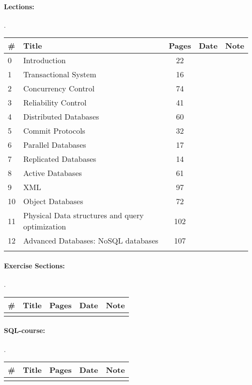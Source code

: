 \documentclass[a4paper,12pt]{article} %
\begin{document}
\paragraph{Lections:}.\\
\begin{tabularx}{\textwidth}{|l|X|c|l|c|}
	\hline
	\# & Title & Pages & Date & Note \\
	\hline
	0 & Introduction & 22 &  &  \\
	\hline
	1 & Transactional System & 16 &  &  \\
	\hline
	2 & Concurrency Control & 74 &  &  \\
	\hline
	3 & Reliability Control & 41 &  &  \\
	\hline
	4 & Distributed Databases & 60 &  &  \\
	\hline
	5 & Commit Protocols & 32 &  &  \\
	\hline
	6 & Parallel Databases & 17 &  &  \\
	\hline
	7 & Replicated Databases & 14 &  &  \\
	\hline
	8 & Active Databases & 61 &  &  \\
	\hline
	9 & XML & 97 &  &  \\
	\hline
	10 & Object Databases & 72 &  &  \\
	\hline
	11 & Physical Data structures and query optimization & 102 &  &  \\
	\hline
	12 & Advanced Databases: NoSQL databases & 107 &  &  \\
	\hline
	&  &  &  &  \\
	\hline
\end{tabularx}

\paragraph{Exercise Sections:}.\\
\begin{tabularx}{\textwidth}{|l|X|c|l|c|}
	\hline
	\# & Title & Pages & Date & Note \\
	\hline
	&  &  &  &  \\
	\hline
\end{tabularx}

\paragraph{SQL-course:}.\\
\begin{tabularx}{\textwidth}{|l|X|c|l|c|}
	\hline
	\# & Title & Pages & Date & Note \\
	\hline
	&  &  &  &  \\
	\hline
\end{tabularx}
\end{document}
